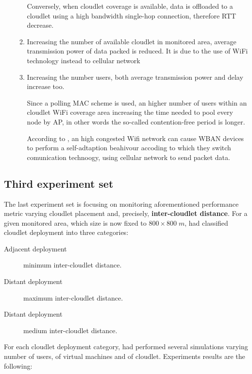 \documentclass[sigchi]{acmart}
\begin{document}
\begin{enumerate}
\begin{enumerate}
Conversely, when cloudlet coverage is available, data is offloaded to a cloudlet using a high bandwidth single-hop connection, therefore RTT decrease.\cite{ArchitecturalTacticsCyberForaging}

\item Increasing the number of available cloudlet in monitored area, average transmission power of data packed is reduced. It is due to the use of WiFi technology instead to cellular network

\item Increasing the number users, both average transmission power and delay increase too. 

Since a polling MAC scheme is used, an higher number of users within an cloudlet WiFi coverage area increasing the time needed to pool every node by AP, in other words the so-called contention-free period is longer. 

According to \citep{MSAReport}, an high congested Wifi network can cause WBAN devices to perform a self-adtaption beahivour accoding to which they switch comunication technoogy, using cellular network to send packet data.




\end{enumerate}

\end{enumerate}


\subsection{Third experiment set}

The last experiment set is focusing on monitoring aforementioned performance metric varying cloudlet placement and, precisely, \textbf{inter-cloudlet distance}. For a given monitored area, which size is now fixed to $800 \times 800 \; m$, \citet{MSAReport} had classified cloudlet deployment into three categories:

\begin{description}
\item[Adjacent deployment] minimum inter-cloudlet distance.
\item[Distant deployment] maximum inter-cloudlet distance.
\item[Distant deployment] medium inter-cloudlet distance.
\end{description}

For each cloudlet deployment category, \citet{MSAReport} had performed several simulations varying number of users, of virtual machines and of cloudlet. Experiments results are the following:
\end{document}
